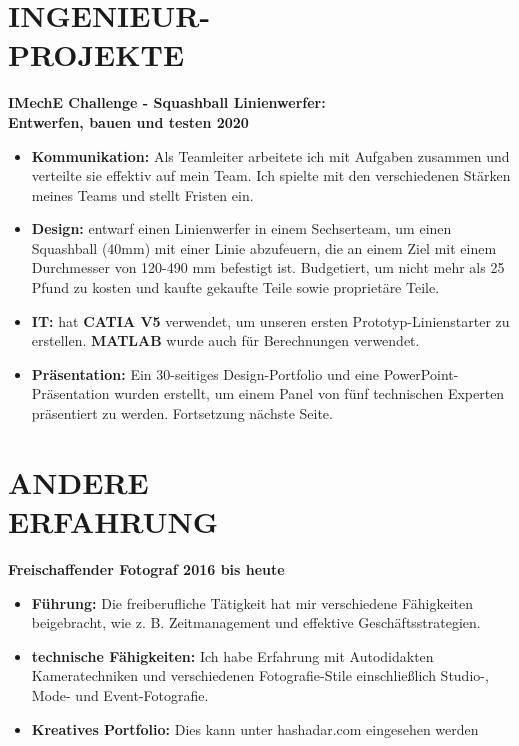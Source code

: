 \documentclass[margin, 10pt]{res} %
\begin{document}
\begin{resume}

\section{INGENIEUR- \\ PROJEKTE}

\textbf{IMechE Challenge - Squashball Linienwerfer: \\Entwerfen, bauen und testen \hfill 2020}
\\
\begin{itemize}
  \item \textbf{Kommunikation:} 
  Als Teamleiter arbeitete ich mit Aufgaben zusammen und verteilte sie effektiv auf mein Team. Ich spielte mit den verschiedenen Stärken meines Teams und stellt Fristen ein.  
  \item \textbf{Design:} entwarf einen Linienwerfer in einem Sechserteam, um einen Squashball (40\si{\milli \meter}) mit einer Linie abzufeuern, die an einem Ziel mit einem Durchmesser von 120-490 \si{\milli \meter} befestigt ist. Budgetiert, um nicht mehr als 25 Pfund zu kosten und kaufte gekaufte Teile sowie proprietäre Teile.
  \item \textbf{IT:} hat \textbf{CATIA V5} verwendet, um unseren ersten Prototyp-Linienstarter zu erstellen. \textbf{MATLAB} wurde auch für Berechnungen verwendet.
  \item \textbf{Präsentation:} Ein 30-seitiges Design-Portfolio und eine PowerPoint-Präsentation wurden erstellt, um einem Panel von fünf technischen Experten präsentiert zu werden. Fortsetzung nächste Seite.
\end{itemize}
 
 
\section{ANDERE \\ ERFAHRUNG}
\textbf{Freischaffender Fotograf \hfill 2016 bis heute}
\\
\begin{itemize}
  \item \textbf{Führung:} Die freiberufliche Tätigkeit hat mir verschiedene Fähigkeiten beigebracht, wie z. B. Zeitmanagement und effektive Geschäftsstrategien.
  \item \textbf{technische Fähigkeiten:} Ich habe Erfahrung mit Autodidakten Kameratechniken und verschiedenen Fotografie-Stile einschließlich Studio-, Mode- und Event-Fotografie.
  \item \textbf{Kreatives Portfolio:} Dies kann unter hashadar.com eingesehen werden
\end{itemize}


\end{resume}
\end{document}
